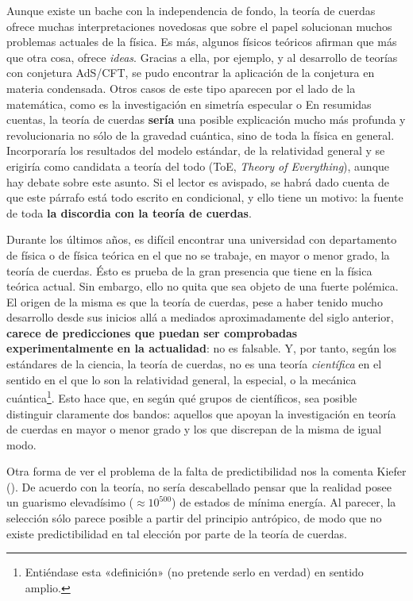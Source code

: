 \documentclass[11pt,a4paper,titlepage]{article}
\begin{document}
Aunque existe un bache con la independencia de fondo, la teoría de cuerdas ofrece muchas interpretaciones novedosas que sobre el papel solucionan muchos problemas actuales de la física. Es más, algunos físicos teóricos afirman que más que otra cosa, ofrece \textit{ideas}. Gracias a ella, por ejemplo, y al desarrollo de teorías con conjetura AdS/CFT, se pudo encontrar la aplicación de la conjetura en materia condensada. Otros casos de este tipo aparecen por el lado de la matemática, como es la investigación en simetría especular o En resumidas cuentas, la teoría de cuerdas \textbf{sería} una posible explicación mucho más profunda y revolucionaria no sólo de la gravedad cuántica, sino de toda la física en general. Incorporaría los resultados del modelo estándar, de la relatividad general y se erigiría como candidata a teoría del todo (ToE, \textit{Theory of Everything}), aunque hay debate sobre este asunto. Si el lector es avispado, se habrá dado cuenta de que este párrafo está todo escrito en condicional, y ello tiene un motivo: la fuente de toda \textbf{la discordia con la teoría de cuerdas}.

Durante los últimos años, es difícil encontrar una universidad con departamento de física o de física teórica en el que no se trabaje, en mayor o menor grado, la teoría de cuerdas. Ésto es prueba de la gran presencia que tiene en la física teórica actual. Sin embargo, ello no quita que sea objeto de una fuerte polémica. El origen de la misma es que la teoría de cuerdas, pese a haber tenido mucho desarrollo desde sus inicios allá a mediados aproximadamente del siglo anterior, \textbf{carece de predicciones que puedan ser comprobadas experimentalmente en la actualidad}: no es falsable. Y, por tanto, según los estándares de la ciencia, la teoría de cuerdas, no es una teoría \textit{científica} en el sentido en el que lo son la relatividad general, la especial, o la mecánica cuántica\footnote{Entiéndase esta «definición» (no pretende serlo en verdad) en sentido amplio.}. Esto hace que, en según qué grupos de científicos, sea posible distinguir claramente dos bandos: aquellos que apoyan la investigación en teoría de cuerdas en mayor o menor grado y los que discrepan de la misma de igual modo.

Otra forma de ver el problema de la falta de predictibilidad nos la comenta Kiefer (\cite[p.~8]{paper_osorio}). De acuerdo con la teoría, no sería descabellado pensar que la realidad posee un guarismo elevadísimo ($\approx10^{500}$) de estados de mínima energía. Al parecer, la selección sólo parece posible a partir del principio antrópico, de modo que no existe predictibilidad en tal elección por parte de la teoría de cuerdas.
\end{document}
